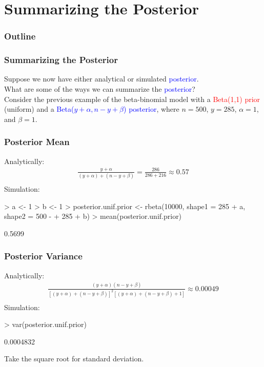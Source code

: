 \documentclass[handout]{beamer}
\begin{document}
\section{Summarizing the Posterior}

\begin{frame}
\frametitle{Outline}
\tableofcontents[currentsection]
\end{frame}

\begin{frame}
\frametitle{Summarizing the Posterior}
\pause
Suppose we now have either analytical or simulated \textcolor{blue}{posterior}.  \\
\pause
\bigskip
What are some of the ways we can summarize the \textcolor{blue}{posterior}? \\
\pause
\bigskip
Consider the previous example of the beta-binomial model with a
\textcolor{red}{Beta(1,1) prior} (uniform) and a
\textcolor{blue}{Beta($y+\alpha, n-y+\beta$) posterior}, where $n=500$,
$y = 285$, $\alpha = 1$, and $\beta = 1$.
\end{frame}

\begin{frame}[fragile]
\frametitle{Posterior Mean}
\pause
Analytically:
\begin{eqnarray*}
\frac{y+\alpha}{(y+\alpha) + (n-y+\beta)} = \frac{286}{286+216}
\approx 0.57\\
\end{eqnarray*}
\pause
\bigskip
Simulation:
\tiny
\begin{Schunk}
\begin{Sinput}
> a <- 1
> b <- 1
> posterior.unif.prior <- rbeta(10000, shape1 = 285 + a, shape2 = 500 - 
+     285 + b)
> mean(posterior.unif.prior)
\end{Sinput}
\begin{Soutput}
[1] 0.5699
\end{Soutput}
\end{Schunk}
\normalsize
\end{frame}

\begin{frame}[fragile]
\frametitle{Posterior Variance}
\pause
Analytically:
\begin{eqnarray*}
\frac{(y+\alpha)(n-y+\beta)}{[(y+\alpha) + (n-y+\beta)]^2 [(y+\alpha)
+ (n-y+\beta) + 1]} %
\approx  0.00049\\
\end{eqnarray*}
\pause
\bigskip
Simulation:
\tiny
\begin{Schunk}
\begin{Sinput}
> var(posterior.unif.prior)
\end{Sinput}
\begin{Soutput}
[1] 0.0004832
\end{Soutput}
\end{Schunk}
\normalsize
\pause
Take the square root for standard deviation.
\end{frame}
\end{document}
